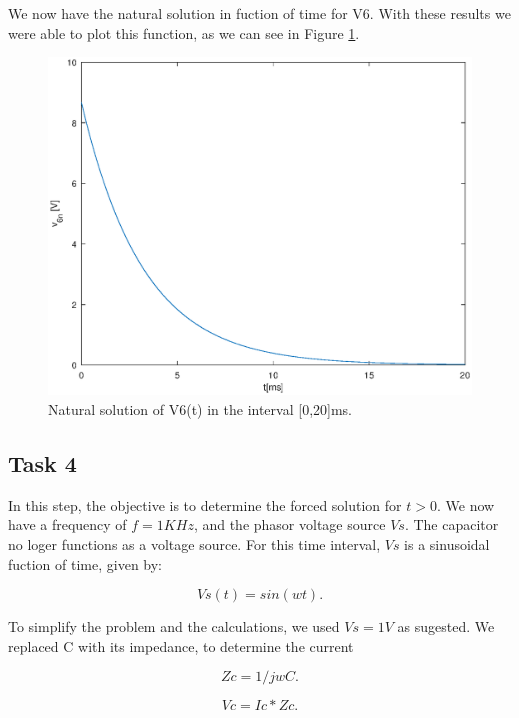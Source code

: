 \par We now have the natural solution in fuction of time for V6. With these results we were able to plot this function, as we can see in Figure \ref{fig:g_3}.

\begin{figure}[h] \centering
\includegraphics[width=0.8\linewidth]{natural_solution.eps}
\caption{Natural solution of V6(t) in the interval [0,20]ms.}
\label{fig:g_3}
\end{figure}
 
 \newpage
 
\subsection{Task 4}

\par In this step, the objective is to determine the forced solution for $t>0$. We now have a frequency of $f = 1KHz$, and the phasor voltage source $Vs$. The capacitor no loger functions as a voltage source. For this time interval, $Vs$ is a sinusoidal fuction of time, given by:

\begin{equation}
  Vs(t) = sin(wt).
\end{equation}

\par To simplify the problem and the calculations, we used $Vs=1V$ as sugested. We replaced C with its impedance, to determine the current

\begin{equation}
  Zc = 1/jwC.
\end{equation}

\begin{equation}
  Vc = Ic*Zc.
\end{equation}


